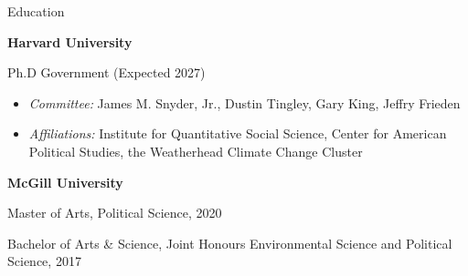 \documentclass{resume}
\begin{document}

\bigskip

\begin{rSection}{\Large E\MakeLowercase{ducation}}

{\bf Harvard University} \hfill {\em } 
\vspace{-0.1cm}

Ph.D Government (Expected 2027) \hfill { } 
{\vspace{-\baselineskip}
\begin{itemize}[topsep=0pt]
\bigskip
    \item[] \textit{Committee:} James M. Snyder, Jr., Dustin Tingley, Gary King, Jeffry Frieden 
    
   \item[] \textit{Affiliations:} Institute for Quantitative Social Science, Center for American Political Studies, the Weatherhead Climate Change Cluster


\end{itemize}
}

\bigskip

{\bf McGill University} \hfill {\em } 
\vspace{-0.1cm}

Master of Arts, Political Science, 2020 \hfill { } 

Bachelor of Arts \& Science, Joint Honours Environmental Science and Political Science, 2017

\end{rSection}



\bigskip
\end{document}
